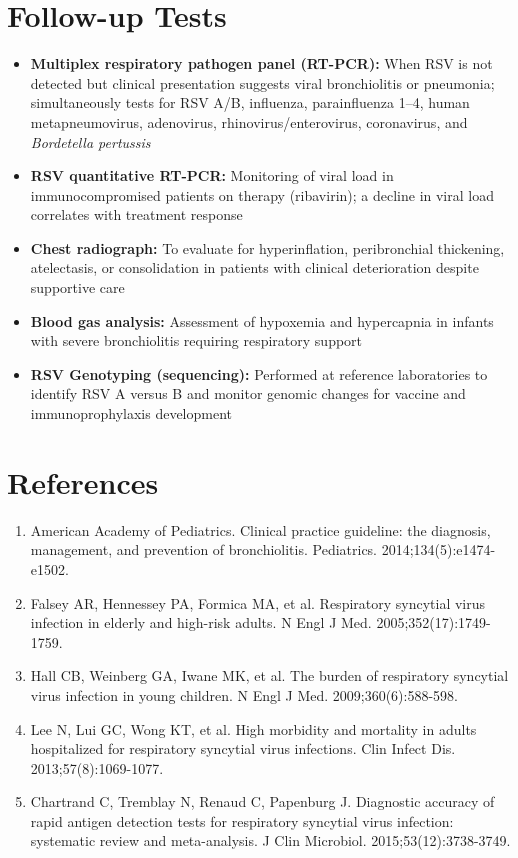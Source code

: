 \section*{Follow-up Tests}
\begin{itemize}
  \item \textbf{Multiplex respiratory pathogen panel (RT-PCR):} When RSV is not detected but clinical presentation suggests viral bronchiolitis or pneumonia; simultaneously tests for RSV A/B, influenza, parainfluenza 1--4, human metapneumovirus, adenovirus, rhinovirus/enterovirus, coronavirus, and \textit{Bordetella pertussis}
  \item \textbf{RSV quantitative RT-PCR:} Monitoring of viral load in immunocompromised patients on therapy (ribavirin); a decline in viral load correlates with treatment response
  \item \textbf{Chest radiograph:} To evaluate for hyperinflation, peribronchial thickening, atelectasis, or consolidation in patients with clinical deterioration despite supportive care
  \item \textbf{Blood gas analysis:} Assessment of hypoxemia and hypercapnia in infants with severe bronchiolitis requiring respiratory support
  \item \textbf{RSV Genotyping (sequencing):} Performed at reference laboratories to identify RSV A versus B and monitor genomic changes for vaccine and immunoprophylaxis development
\end{itemize}

\section*{References}
\begin{enumerate}
  \item American Academy of Pediatrics. Clinical practice guideline: the diagnosis, management, and prevention of bronchiolitis. Pediatrics. 2014;134(5):e1474-e1502.
  \item Falsey AR, Hennessey PA, Formica MA, et al. Respiratory syncytial virus infection in elderly and high-risk adults. N Engl J Med. 2005;352(17):1749-1759.
  \item Hall CB, Weinberg GA, Iwane MK, et al. The burden of respiratory syncytial virus infection in young children. N Engl J Med. 2009;360(6):588-598.
  \item Lee N, Lui GC, Wong KT, et al. High morbidity and mortality in adults hospitalized for respiratory syncytial virus infections. Clin Infect Dis. 2013;57(8):1069-1077.
  \item Chartrand C, Tremblay N, Renaud C, Papenburg J. Diagnostic accuracy of rapid antigen detection tests for respiratory syncytial virus infection: systematic review and meta-analysis. J Clin Microbiol. 2015;53(12):3738-3749.
\end{enumerate}

\clearpage
